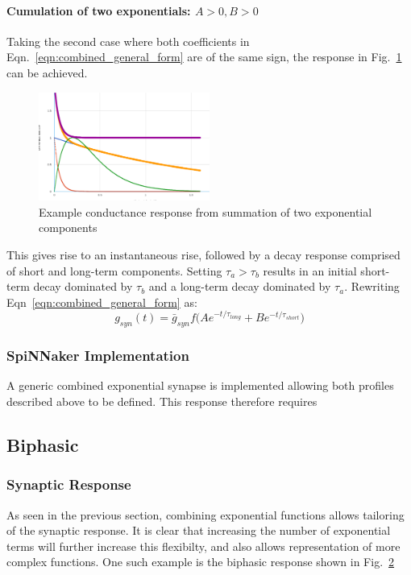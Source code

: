 \documentclass[12pt]{article}
\begin{document}
\paragraph{Cumulation of two exponentials: $A>0, B>0$ \\}
\noindent Taking the second case where both coefficients in
Eqn.~\ref{eqn:combined_general_form} are of the same sign, the response in
Fig.~\ref{fig:combined_exp_example} can be achieved.
 \begin{figure}[!h]
\begin{centering}
\includegraphics[width=0.5\textwidth]{figures/combined_general_cumulation.ps}
\caption{Example conductance response from summation of two exponential
components}
\label{fig:combined_exp_example}
\end{centering}
\end{figure}
This gives rise to an instantaneous rise, followed by a decay
response comprised of short and long-term components. Setting $\tau_a > \tau_b$
results in an initial short-term decay dominated by $\tau_b$ and a long-term
decay dominated by $\tau_a$. Rewriting Eqn~\ref{eqn:combined_general_form} as:
\begin{equation}
g_{syn}(t)=\bar{g}_{syn}f\Big(Ae^{-t / \tau_{long}} + Be^{-t /
\tau_{short}}\Big)
\label{eqn:combined_exponential_cumulation_response}
\end{equation}

\subsubsection*{SpiNNaker Implementation}
A generic combined exponential synapse is implemented allowing both profiles
described above to be defined. This response therefore requires


\subsection{Biphasic}
\subsubsection*{Synaptic Response}
As seen in the previous section, combining exponential functions allows
tailoring of the synaptic response. It is clear that increasing the number of
exponential terms will further increase this flexibilty, and also allows
representation of more complex functions. One such example is the biphasic
response shown in Fig.~\ref{fig:biphasic_response}
\begin{figure}
\begin{centering}
\label{fig:biphasic_response}
\end{centering}
\end{figure}
\end{document}
